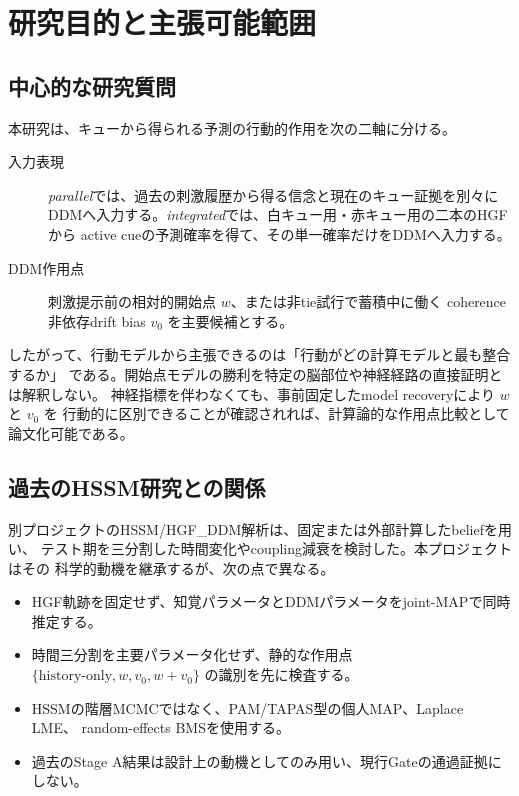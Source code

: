 \documentclass[11pt]{ltjsarticle}
\begin{document}
\section{研究目的と主張可能範囲}

\subsection{中心的な研究質問}

本研究は、キューから得られる予測の行動的作用を次の二軸に分ける。

\begin{description}
  \item[入力表現]
    \emph{parallel}では、過去の刺激履歴から得る信念と現在のキュー証拠を別々に
    DDMへ入力する。\emph{integrated}では、白キュー用・赤キュー用の二本のHGFから
    active cueの予測確率を得て、その単一確率だけをDDMへ入力する。
  \item[DDM作用点]
    刺激提示前の相対的開始点 \(w\)、または非tie試行で蓄積中に働く
    coherence非依存drift bias \(v_0\) を主要候補とする。
\end{description}

したがって、行動モデルから主張できるのは「行動がどの計算モデルと最も整合するか」
である。開始点モデルの勝利を特定の脳部位や神経経路の直接証明とは解釈しない。
神経指標を伴わなくても、事前固定したmodel recoveryにより \(w\) と \(v_0\) を
行動的に区別できることが確認されれば、計算論的な作用点比較として論文化可能である。

\subsection{過去のHSSM研究との関係}

別プロジェクトのHSSM/HGF\_DDM解析は、固定または外部計算したbeliefを用い、
テスト期を三分割した時間変化やcoupling減衰を検討した。本プロジェクトはその
科学的動機を継承するが、次の点で異なる。

\begin{itemize}
  \item HGF軌跡を固定せず、知覚パラメータとDDMパラメータをjoint-MAPで同時推定する。
  \item 時間三分割を主要パラメータ化せず、静的な作用点
        \(\{\text{history-only},w,v_0,w+v_0\}\) の識別を先に検査する。
  \item HSSMの階層MCMCではなく、PAM/TAPAS型の個人MAP、Laplace LME、
        random-effects BMSを使用する。
  \item 過去のStage A結果は設計上の動機としてのみ用い、現行Gateの通過証拠にしない。
\end{itemize}
\end{document}
